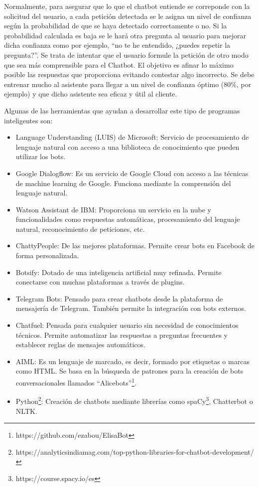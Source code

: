Normalmente, para asegurar que lo que el chatbot entiende se correponde con la solicitud del usuario, a cada petición detectada se le asigna un nivel de confianza según la probabilidad de que se haya detectado correctamente o no. Si la probabilidad calculada es baja se le hará otra pregunta al usuario para mejorar dicha confianza como por ejemplo, ``no te he entendido, ¿puedes repetir la pregunta?''. Se trata de intentar que el usuario formule la petición de otro modo que sea más comprensible para el Chatbot. El objetivo es afinar lo máximo posible las respuestas que proporciona evitando contestar algo incorrecto. Se debe entrenar mucho al asistente para llegar a un nivel de confianza óptimo (80\%, por ejemplo) y que dicho asistente sea eficaz y útil al cliente.

Algunas de las herramientas \citep{herrchatbot} que ayudan a desarrollar este tipo de programas inteligentes son:

\begin{itemize}
	\item Language Understanding (LUIS) de Microsoft: Servicio de procesamiento de lenguaje natural con acceso a una biblioteca de conocimiento que pueden utilizar los bots.
	\item Google Dialogflow: Es un servicio de Google Cloud con acceso a las técnicas de machine learning de Google. Funciona mediante la comprensión del lenguaje natural.
	\item Watson Assistant de IBM: Proporciona un servicio en la nube y funcionalidades como respuestas automáticas, procesamiento del lenguaje natural, reconocimiento de peticiones, etc.
	\item ChattyPeople: De las mejores plataformas. Permite crear bots en Facebook de forma personalizada.
	\item Botsify: Dotado de una inteligencia artificial muy refinada. Permite conectarse con muchas plataformas a través de plugins. 
	\item Telegram Bots: Pensado para crear chatbots desde la plataforma de mensajería de Telegram. También permite la integración con bots externos.
	\item Chatfuel: Pensada para cualquier usuario sin necesidad de conocimientos técnicos. Permite automatizar las respuestas a preguntas frecuentes y establecer reglas de mensajes automáticos.
	\item AIML: Es un lenguaje de marcado, es decir, formado por etiquetas o marcas como HTML. Se basa en la búsqueda de patrones para la creación de bots conversacionales llamados ``Alicebots''\footnote{https://github.com/ezabou/ElisaBot}. 
	\item Python\footnote{https://analyticsindiamag.com/top-python-libraries-for-chatbot-development/}: Creación de chatbots mediante librerías como spaCy\footnote{https://course.spacy.io/es}, Chatterbot o NLTK.
\end{itemize} 

